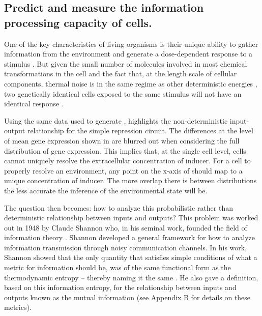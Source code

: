 \subsection{Predict and measure the information processing capacity of cells.}


One of the key characteristics of living organisms is their unique ability to
gather information from the environment and generate a dose-dependent response
to a stimulus \cite{Nemenman2010}. But given the small number of molecules
involved in most chemical transformations in the cell and the fact that, at the
length scale of cellular components, thermal noise is in the same regime as
other deterministic energies \cite{Phillips2006}, two genetically identical
cells exposed to the same stimulus will not have an identical response
\cite{Eldar2010}.

Using the same data used to generate , 
highlights the non-deterministic input-output relationship for the simple
repression circuit. The differences at the level of mean gene expression shown
in  are blurred out when considering the full distribution of gene
expression. This implies that, at the single cell level, cells cannot uniquely
resolve the extracellular concentration of inducer. For a cell to properly
resolve an environment, any point on the x-axis of  should
map to a unique concentration of inducer. The more overlap there is between
distributions the less accurate the inference of the environmental state will
be.


The question then becomes: how to analyze this probabilistic rather than
deterministic relationship between inputs and outputs? This problem was worked
out in 1948 by Claude Shannon who, in his seminal work, founded the field of
information theory \cite{Shannon1948}. Shannon developed a general framework for
how to analyze information transmission through noisy communication channels. In
his work, Shannon showed that the only quantity that satisfies simple
conditions of what a metric for information should be, was of the same
functional form as the thermodynamic entropy -- thereby naming it the same
\cite{MacKay2003}. He also gave a definition, based on this information entropy,
for the relationship between inputs and outputs known as the mutual information
(see Appendix B for details on these metrics).


